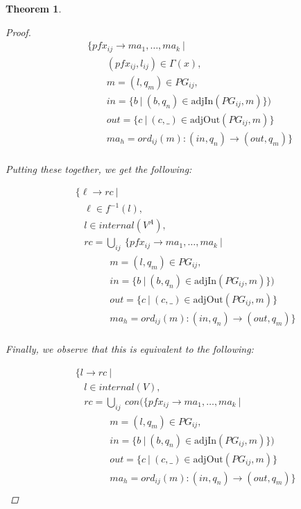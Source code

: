 \documentclass[twocolumn]{sig-alternate-10pt}
\newtheorem{thm}{Theorem}
\begin{document}
\begin{thm}
\begin{proof}
 \[ \begin{array}{l}
     ~~~~~~~~~ \{ pfx_{ij} \rightarrow ma_1, \dots, ma_k ~\vert~ \\
     ~~~~~~~~~~~~~~~~~~ (pfx_{ij}, l_{ij}) \in \Gamma(x), \\
     ~~~~~~~~~~~~~~~~~~ m = (l,q_m) \in PG_{ij}, \\
     ~~~~~~~~~~~~~~~~~~ in = \{ b ~\vert~ (b,q_n) \in \text{adjIn}(PG_{ij},m) \}) \\
     ~~~~~~~~~~~~~~~~~~ out = \{ c ~\vert~ (c,\_) \in \text{adjOut}(PG_{ij},m) \} \\
     ~~~~~~~~~~~~~~~~~~ ma_h = ord_{ij}(m) : (in,q_n) \rightarrow (out,q_m) \} \\
  \end{array} \]%

  Putting these together, we get the following:

  \[ \begin{array}{l}
     ~~~~~ \{ \ell \rightarrow rc ~\vert~ \\
     ~~~~~~~~~ \ell \in f^{-1}(l), \\
     ~~~~~~~~~ l \in internal(V^A), \\
     ~~~~~~~~~ rc = \bigcup_{ij}~ \{ pfx_{ij} \rightarrow ma_1, \dots, ma_k ~\vert~ \\
     ~~~~~~~~~~~~~~~~~~~~~ m = (l,q_m) \in PG_{ij}, \\
     ~~~~~~~~~~~~~~~~~~~~~ in = \{ b ~\vert~ (b,q_n) \in \text{adjIn}(PG_{ij},m) \}) \\
     ~~~~~~~~~~~~~~~~~~~~~ out = \{ c ~\vert~ (c,\_) \in \text{adjOut}(PG_{ij},m) \} \\
     ~~~~~~~~~~~~~~~~~~~~~ ma_h = ord_{ij}(m) : (in,q_n) \rightarrow (out,q_m) \} \\
  \end{array} \]%


  Finally, we observe that this is equivalent to the following:

  \[ \begin{array}{l}
     ~~~~~ \{ l \rightarrow rc ~\vert~ \\
     ~~~~~~~~~ l \in internal(V), \\
     ~~~~~~~~~ rc = \bigcup_{ij}~ con(\{ pfx_{ij} \rightarrow ma_1, \dots, ma_k ~\vert~ \\
     ~~~~~~~~~~~~~~~~~~~~~ m = (l,q_m) \in PG_{ij}, \\
     ~~~~~~~~~~~~~~~~~~~~~ in = \{ b ~\vert~ (b,q_n) \in \text{adjIn}(PG_{ij},m) \}) \\
     ~~~~~~~~~~~~~~~~~~~~~ out = \{ c ~\vert~ (c,\_) \in \text{adjOut}(PG_{ij},m) \} \\
     ~~~~~~~~~~~~~~~~~~~~~ ma_h = ord_{ij}(m) : (in,q_n) \rightarrow (out,q_m) \} \\
  \end{array} \]%


\end{proof}
\end{thm}
\end{document}
